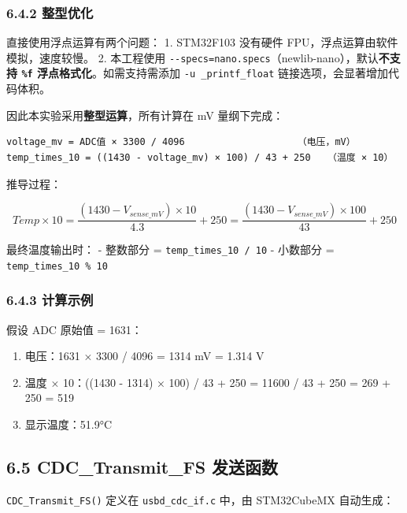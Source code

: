 \documentclass[
  chinese,
  UTF8,
  oneside,
  openany]{ctexbook}
\providecommand{\tightlist}{%
  \setlength{\itemsep}{0pt}\setlength{\parskip}{0pt}}
\begin{document}
\subsubsection{6.4.2 整型优化}\label{ux6574ux578bux4f18ux5316}

直接使用浮点运算有两个问题： 1. STM32F103 没有硬件
FPU，浮点运算由软件模拟，速度较慢。 2. 本工程使用
\texttt{-\/-specs=nano.specs}（newlib-nano），默认\textbf{不支持
\texttt{\%f} 浮点格式化}。如需支持需添加 \texttt{-u\ \_printf\_float}
链接选项，会显著增加代码体积。

因此本实验采用\textbf{整型运算}，所有计算在 mV 量纲下完成：

\begin{verbatim}
voltage_mv = ADC值 × 3300 / 4096                    （电压，mV）
temp_times_10 = ((1430 - voltage_mv) × 100) / 43 + 250   （温度 × 10）
\end{verbatim}

推导过程：

\[Temp \times 10 = \frac{(1430 - V_{sense\_mV}) \times 10}{4.3} + 250 = \frac{(1430 - V_{sense\_mV}) \times 100}{43} + 250\]

最终温度输出时： - 整数部分 = \texttt{temp\_times\_10\ /\ 10} - 小数部分
= \texttt{\textbar{}temp\_times\_10\textbar{}\ \%\ 10}

\subsubsection{6.4.3 计算示例}\label{ux8ba1ux7b97ux793aux4f8b}

假设 ADC 原始值 = 1631：

\begin{enumerate}
\def\labelenumi{\arabic{enumi}.}
\tightlist
\item
  电压：1631 × 3300 / 4096 = 1314 mV = 1.314 V
\item
  温度 × 10：((1430 - 1314) × 100) / 43 + 250 = 11600 / 43 + 250 = 269 +
  250 = 519
\item
  显示温度：51.9°C
\end{enumerate}

\subsection{6.5 CDC\_Transmit\_FS
发送函数}\label{cdc_transmit_fs-ux53d1ux9001ux51fdux6570}

\texttt{CDC\_Transmit\_FS()} 定义在 \texttt{usbd\_cdc\_if.c} 中，由
STM32CubeMX 自动生成：
\end{document}
